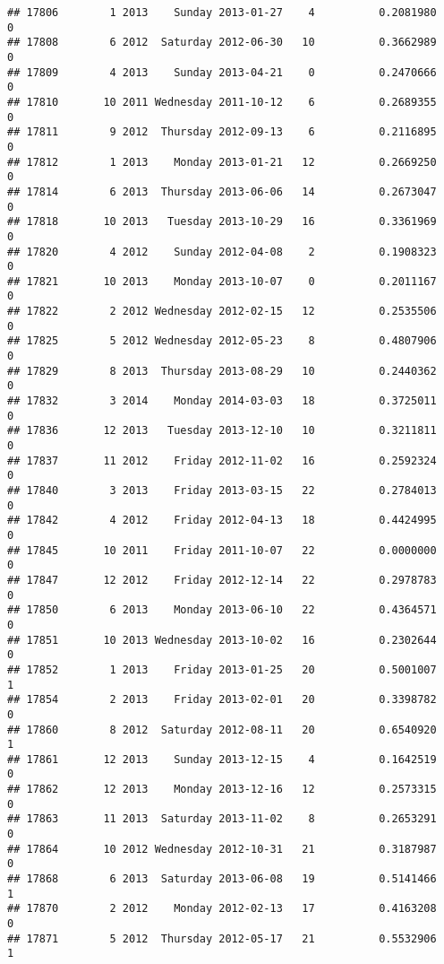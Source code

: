 \documentclass[
]{article}
\begin{document}
\begin{verbatim}
## 17806        1 2013    Sunday 2013-01-27    4          0.2081980             0
## 17808        6 2012  Saturday 2012-06-30   10          0.3662989             0
## 17809        4 2013    Sunday 2013-04-21    0          0.2470666             0
## 17810       10 2011 Wednesday 2011-10-12    6          0.2689355             0
## 17811        9 2012  Thursday 2012-09-13    6          0.2116895             0
## 17812        1 2013    Monday 2013-01-21   12          0.2669250             0
## 17814        6 2013  Thursday 2013-06-06   14          0.2673047             0
## 17818       10 2013   Tuesday 2013-10-29   16          0.3361969             0
## 17820        4 2012    Sunday 2012-04-08    2          0.1908323             0
## 17821       10 2013    Monday 2013-10-07    0          0.2011167             0
## 17822        2 2012 Wednesday 2012-02-15   12          0.2535506             0
## 17825        5 2012 Wednesday 2012-05-23    8          0.4807906             0
## 17829        8 2013  Thursday 2013-08-29   10          0.2440362             0
## 17832        3 2014    Monday 2014-03-03   18          0.3725011             0
## 17836       12 2013   Tuesday 2013-12-10   10          0.3211811             0
## 17837       11 2012    Friday 2012-11-02   16          0.2592324             0
## 17840        3 2013    Friday 2013-03-15   22          0.2784013             0
## 17842        4 2012    Friday 2012-04-13   18          0.4424995             0
## 17845       10 2011    Friday 2011-10-07   22          0.0000000             0
## 17847       12 2012    Friday 2012-12-14   22          0.2978783             0
## 17850        6 2013    Monday 2013-06-10   22          0.4364571             0
## 17851       10 2013 Wednesday 2013-10-02   16          0.2302644             0
## 17852        1 2013    Friday 2013-01-25   20          0.5001007             1
## 17854        2 2013    Friday 2013-02-01   20          0.3398782             0
## 17860        8 2012  Saturday 2012-08-11   20          0.6540920             1
## 17861       12 2013    Sunday 2013-12-15    4          0.1642519             0
## 17862       12 2013    Monday 2013-12-16   12          0.2573315             0
## 17863       11 2013  Saturday 2013-11-02    8          0.2653291             0
## 17864       10 2012 Wednesday 2012-10-31   21          0.3187987             0
## 17868        6 2013  Saturday 2013-06-08   19          0.5141466             1
## 17870        2 2012    Monday 2012-02-13   17          0.4163208             0
## 17871        5 2012  Thursday 2012-05-17   21          0.5532906             1

\end{verbatim}
\end{document}

